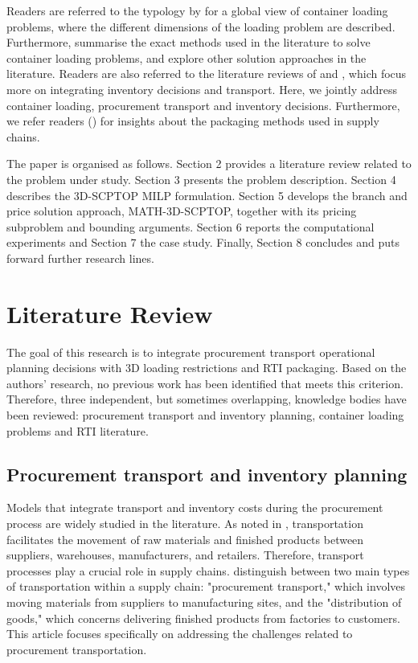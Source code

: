 Readers are referred to the typology by  \autocite{Wascher2007AnProblems} for a global view of container loading problems, where the different dimensions of the loading problem are described. Furthermore, \autocite{Silva2019ExactProblems} summarise the exact methods used in the literature to solve container loading problems, and \autocite{Zhao2016INTERNATIONALAlgorithms} explore other solution approaches in the literature. Readers are also referred to the literature reviews of \autocite{Mosca2019IntegratedReview} and \autocite{Diaz-Madronero2015ADecisions}, which focus more on integrating inventory decisions and transport. Here, we jointly address container loading, procurement transport and inventory decisions. {\color{blue} Furthermore, we refer readers () for insights about the packaging methods used in supply chains.}

{\color{blue}
The paper is organised as follows. Section 2 provides a literature review related to the problem under study. Section 3 presents the problem description. Section 4 describes the 3D-SCPTOP MILP formulation. Section 5 develops the branch and price solution approach, MATH-3D-SCPTOP, together with its pricing subproblem and bounding arguments. Section 6 reports the computational experiments and Section 7 the case study. Finally, Section 8 concludes and puts forward further research lines.
}

\section{Literature Review}

The goal of this research is to integrate procurement transport operational planning decisions with 3D loading restrictions and RTI packaging. Based on the authors’ research, no previous work has been identified that meets this criterion. Therefore, three independent, but sometimes overlapping, knowledge bodies have been reviewed: procurement transport and inventory planning, container loading problems and RTI literature.

\subsection{Procurement transport and inventory planning}

Models that integrate transport and inventory costs during the procurement process are widely studied in the literature. As noted in \autocite{Langley2020SupplyPerspective}, transportation facilitates the movement of raw materials and finished products between suppliers,  warehouses, manufacturers, and retailers. Therefore, transport processes play a crucial role in supply chains. \autocite{Fleischmann2015TransportDistribution} distinguish between two main types of transportation within a supply chain: "procurement transport," which involves moving materials from suppliers to manufacturing sites, and the "distribution of goods," which concerns delivering finished products from factories to customers. This article focuses specifically on addressing the challenges related to procurement transportation.


